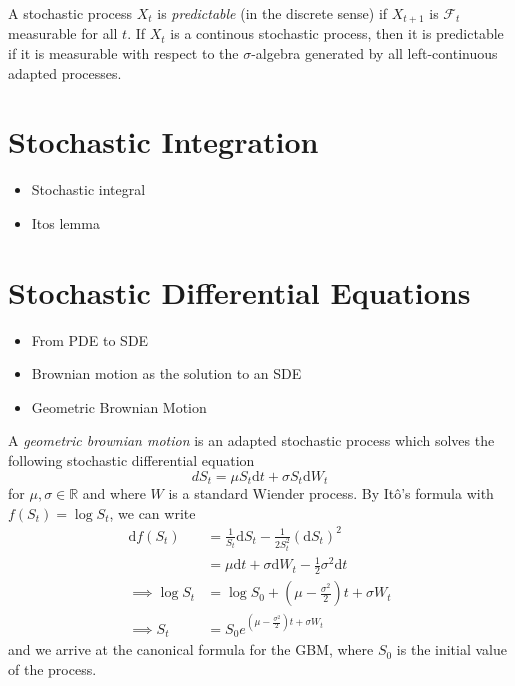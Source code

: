 \begin{definition}
    A stochastic process $X_t$ is \emph{predictable} (in the discrete sense) 
    if $X_{t+1}$ is $\mathcal{F}_{t}$ measurable for all $t$. If $X_t$
    is a continous stochastic process, then it is predictable if it is 
    measurable with respect to the $\sigma$-algebra generated by all left-continuous
    adapted processes.
\end{definition}


\section{Stochastic Integration}
\begin{itemize}
    \item Stochastic integral
    \item Itos lemma
\end{itemize}

\section{Stochastic Differential Equations}
\begin{itemize}
    \item From PDE to SDE
    \item Brownian motion as the solution to an SDE
    \item Geometric Brownian Motion
\end{itemize}
\begin{definition}
    A \emph{geometric brownian motion} is an adapted stochastic process which solves the following
    stochastic differential equation
    \begin{equation}
        dS_t=\mu S_t\mathrm dt + \sigma S_t\mathrm dW_t
    \end{equation}
    for $\mu,\sigma\in\mathbb{R}$ and where $W$ is a standard Wiender process.
    By It\^{o}'s formula with $f(S_t)=\log S_t$, we can write
    \begin{align*}
        \mathrm df(S_t)&=\frac{1}{S_t}\mathrm dS_t-\frac{1}{2S_t^2}(\mathrm dS_t)^2\\
        &=\mu\mathrm dt+\sigma\mathrm dW_t-\frac{1}{2}\sigma^2\mathrm dt\\
        \implies \log S_t&=\log S_0+\left(\mu-\frac{\sigma^2}{2}\right)t+\sigma W_t\\
        \implies S_t&=S_0e^{\left(\mu-\frac{\sigma^2}{2}\right)t+\sigma W_t}
    \end{align*}
    and we arrive at the canonical formula for the GBM, where $S_0$ is the initial value of the process.
\end{definition}
